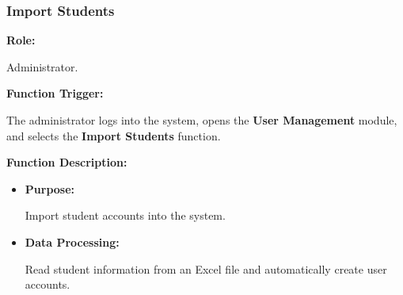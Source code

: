 %

%

%

\subsubsection{Import Students}

\textbf{Role:}

Administrator.

\vspace{0.3cm}

\textbf{Function Trigger:}

The administrator logs into the system, opens the \textbf{User Management} module, and selects the \textbf{Import Students} function.

\vspace{0.3cm}

\textbf{Function Description:}

\begin{itemize}
    \item \textbf{Purpose:}

    Import student accounts into the system.

    \item \textbf{Data Processing:}

    Read student information from an Excel file and automatically create user accounts.
\end{itemize}

